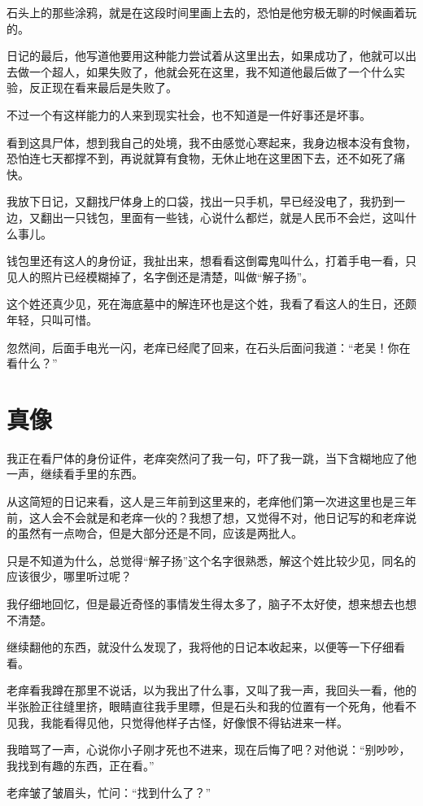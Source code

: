 石头上的那些涂鸦，就是在这段时间里画上去的，恐怕是他穷极无聊的时候画着玩的。

日记的最后，他写道他要用这种能力尝试着从这里出去，如果成功了，他就可以出去做一个超人，如果失败了，他就会死在这里，我不知道他最后做了一个什么实验，反正现在看来最后是失败了。

不过一个有这样能力的人来到现实社会，也不知道是一件好事还是坏事。

看到这具尸体，想到我自己的处境，我不由感觉心寒起来，我身边根本没有食物，恐怕连七天都撑不到，再说就算有食物，无休止地在这里困下去，还不如死了痛快。

我放下日记，又翻找尸体身上的口袋，找出一只手机，早已经没电了，我扔到一边，又翻出一只钱包，里面有一些钱，心说什么都烂，就是人民币不会烂，这叫什么事儿。

钱包里还有这人的身份证，我扯出来，想看看这倒霉鬼叫什么，打着手电一看，只见人的照片已经模糊掉了，名字倒还是清楚，叫做“解子扬”。

这个姓还真少见，死在海底墓中的解连环也是这个姓，我看了看这人的生日，还颇年轻，只叫可惜。

忽然间，后面手电光一闪，老痒已经爬了回来，在石头后面问我道：“老吴！你在看什么？”

\chapter{真像}

我正在看尸体的身份证件，老痒突然问了我一句，吓了我一跳，当下含糊地应了他一声，继续看手里的东西。

从这简短的日记来看，这人是三年前到这里来的，老痒他们第一次进这里也是三年前，这人会不会就是和老痒一伙的？我想了想，又觉得不对，他日记写的和老痒说的虽然有一点吻合，但是大部分还是不同，应该是两批人。

只是不知道为什么，总觉得“解子扬”这个名字很熟悉，解这个姓比较少见，同名的应该很少，哪里听过呢？

我仔细地回忆，但是最近奇怪的事情发生得太多了，脑子不太好使，想来想去也想不清楚。

继续翻他的东西，就没什么发现了，我将他的日记本收起来，以便等一下仔细看看。

老痒看我蹲在那里不说话，以为我出了什么事，又叫了我一声，我回头一看，他的半张脸正往缝里挤，眼睛直往我手里瞟，但是石头和我的位置有一个死角，他看不见我，我能看得见他，只觉得他样子古怪，好像恨不得钻进来一样。

我暗骂了一声，心说你小子刚才死也不进来，现在后悔了吧？对他说：“别吵吵，我找到有趣的东西，正在看。”

老痒皱了皱眉头，忙问：“找到什么了？”

